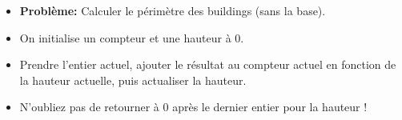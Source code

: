 
\begin{frame}
    \frametitle{\problemtitle}
    \begin{itemize}
        \item<+-> \textbf{Problème:} Calculer le périmètre des buildings (sans la base).
        \item<+-> On initialise un compteur et une hauteur à $0$.
        \item<+-> Prendre l'entier actuel, ajouter le résultat au compteur actuel en fonction de la hauteur actuelle, puis actualiser la hauteur.
          \item<+-> N'oubliez pas de retourner à $0$ après le dernier entier pour la hauteur !
    \end{itemize}
\end{frame}